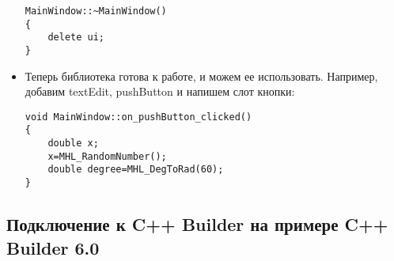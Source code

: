\documentclass[a4paper,12pt]{article}
\begin{document}
\begin{itemize}
\begin{lstlisting}[label=install_03_qt,caption=Пример файла mainwindow.cpp с подключенной библиотекой]
MainWindow::~MainWindow()
{
    delete ui;
}
\end{lstlisting}

\item Теперь библиотека готова к работе, и можем ее использовать. Например, добавим textEdit, pushButton и напишем слот кнопки:
\begin{lstlisting}[label=install_04_qt,caption=Пример использования]
void MainWindow::on_pushButton_clicked()
{
    double x;
    x=MHL_RandomNumber();
    double degree=MHL_DegToRad(60);
}
\end{lstlisting}
\end{itemize}

\subsection{Подключение к C++ Builder на примере C++ Builder 6.0}
\end{document}
